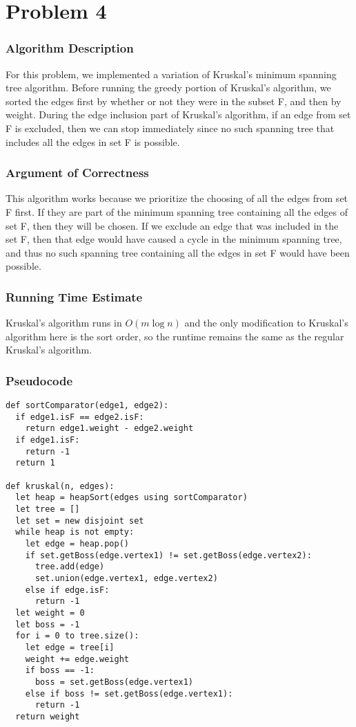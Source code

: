 \documentclass{math}
\begin{document}
\section*{Problem 4}

\subsubsection*{Algorithm Description}
For this problem, we implemented a variation of Kruskal's minimum spanning tree
algorithm. Before running the greedy portion of Kruskal's algorithm, we sorted
the edges first by whether or not they were in the subset F, and then by weight.
During the edge inclusion part of Kruskal's algorithm, if an edge from set F is
excluded, then we can stop immediately since no such spanning tree that includes
all the edges in set F is possible.

\subsubsection*{Argument of Correctness}
This algorithm works because we prioritize the choosing of all the edges from
set F first. If they are part of the minimum spanning tree containing all the
edges of set F, then they will be chosen. If we exclude an edge that was
included in the set F, then that edge would have caused a cycle in the minimum
spanning tree, and thus no such spanning tree containing all the edges in set
F would have been possible.

\subsubsection*{Running Time Estimate}
Kruskal's algorithm runs in \( O(m\log n) \) and the only modification to
Kruskal's algorithm here is the sort order, so the runtime remains the same as
the regular Kruskal's algorithm.

\subsubsection*{Pseudocode}
\begin{lstlisting}
def sortComparator(edge1, edge2):
  if edge1.isF == edge2.isF:
    return edge1.weight - edge2.weight
  if edge1.isF:
    return -1
  return 1

def kruskal(n, edges):
  let heap = heapSort(edges using sortComparator)
  let tree = []
  let set = new disjoint set
  while heap is not empty:
    let edge = heap.pop()
    if set.getBoss(edge.vertex1) != set.getBoss(edge.vertex2):
      tree.add(edge)
      set.union(edge.vertex1, edge.vertex2)
    else if edge.isF:
      return -1
  let weight = 0
  let boss = -1
  for i = 0 to tree.size():
    let edge = tree[i]
    weight += edge.weight
    if boss == -1:
      boss = set.getBoss(edge.vertex1)
    else if boss != set.getBoss(edge.vertex1):
      return -1
  return weight
\end{lstlisting}
\end{document}
